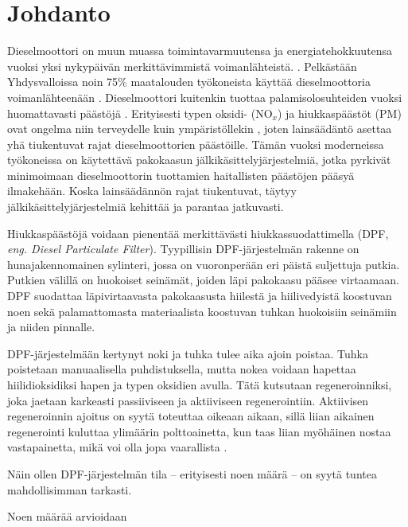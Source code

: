 \chapter{Johdanto}%
\label{ch:johdanto}
Dieselmoottori on muun muassa toimintavarmuutensa ja energiatehokkuutensa vuoksi yksi nykypäivän merkittävimmistä voimanlähteistä.  
\cite[s. 121, 137-138]{Koten_2024}.
Pelkästään Yhdysvalloissa noin 75\% maatalouden työkoneista käyttää dieselmoottoria voimanlähteenään \cite[s. 122]{Koten_2024}.  
Dieselmoottori kuitenkin tuottaa palamisolosuhteiden vuoksi
huomattavasti päästöjä \cite{FiebigMichael2014Pefd}. Erityisesti typen oksidi- (NO\(_x\)) ja hiukkaspäästöt (PM) ovat ongelma niin terveydelle kuin ympäristöllekin \cite{YaoDongwei2023Rodm}\cite[s. 138]{Koten_2024}, joten  lainsäädäntö asettaa yhä tiukentuvat rajat dieselmoottorien päästöille. Tämän vuoksi moderneissa työkoneissa on käytettävä pakokaasun jälkikäsittelyjärjestelmiä, jotka pyrkivät minimoimaan dieselmoottorin tuottamien haitallisten päästöjen pääsyä ilmakehään. Koska lainsäädännön rajat tiukentuvat, täytyy jälkikäsittelyjärjestelmiä kehittää ja parantaa jatkuvasti.

Hiukkaspäästöjä voidaan pienentää merkittävästi hiukkassuodattimella (DPF, \emph{eng. Diesel Particulate Filter}).
Tyypillisin \cite{SHIYunxi2020Eota} DPF-järjestelmän rakenne on hunajakennomainen sylinteri, jossa on vuoronperään eri päistä suljettuja putkia. Putkien välillä on huokoiset seinämät, joiden läpi pakokaasu pääsee virtaamaan.
DPF suodattaa läpivirtaavasta pakokaasusta hiilestä ja hiilivedyistä koostuvan noen sekä palamattomasta materiaalista koostuvan tuhkan huokoisiin seinämiin ja niiden pinnalle. 

DPF-järjestelmään kertynyt noki ja tuhka tulee aika ajoin poistaa. Tuhka poistetaan manuaalisella puhdistuksella, mutta nokea voidaan hapettaa hiilidioksidiksi hapen ja typen oksidien avulla. Tätä kutsutaan regeneroinniksi, joka jaetaan karkeasti passiiviseen ja aktiiviseen regenerointiin.
Aktiivisen regeneroinnin ajoitus on syytä toteuttaa oikeaan aikaan, sillä liian aikainen regenerointi kuluttaa ylimäärin polttoainetta, kun taas liian myöhäinen nostaa vastapainetta, mikä voi olla jopa vaarallista \cite{YaoDongwei2023Rodm}. 


Näin ollen DPF-järjestelmän tila -- erityisesti noen määrä -- on syytä tuntea mahdollisimman tarkasti. 

Noen määrää arvioidaan 


